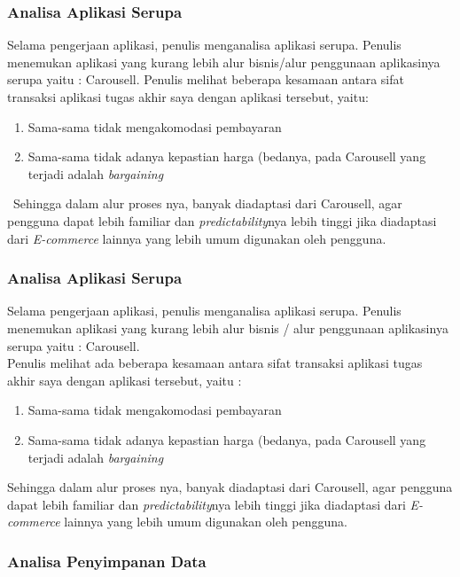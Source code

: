 	\subsubsection{Analisa Aplikasi Serupa}
	\label{alasan-app-serupa}
		Selama pengerjaan aplikasi, penulis menganalisa aplikasi serupa. Penulis menemukan aplikasi yang kurang lebih alur bisnis/alur penggunaan aplikasinya serupa yaitu : Carousell. Penulis melihat beberapa kesamaan antara sifat transaksi aplikasi tugas akhir saya dengan aplikasi tersebut, yaitu:
		\begin{enumerate}
			\item Sama-sama tidak mengakomodasi pembayaran
			\item Sama-sama tidak adanya kepastian harga (bedanya, pada Carousell yang terjadi adalah \textit{bargaining}
		\end{enumerate} \
		\indent Sehingga dalam alur proses nya, banyak diadaptasi dari Carousell, agar pengguna dapat lebih familiar dan \textit{predictability}nya lebih tinggi jika diadaptasi dari \textit{E-commerce} lainnya yang lebih umum digunakan oleh pengguna.
		
	
	\subsubsection{Analisa Aplikasi Serupa}
	\label{alasan-app-serupa}
	Selama pengerjaan aplikasi, penulis menganalisa aplikasi serupa. Penulis menemukan aplikasi yang kurang lebih alur bisnis / alur penggunaan aplikasinya serupa yaitu : Carousell. \\
	\indent Penulis melihat ada beberapa kesamaan antara sifat transaksi aplikasi tugas akhir saya dengan aplikasi tersebut, yaitu :
	\begin{enumerate}
		\item Sama-sama tidak mengakomodasi pembayaran
		\item Sama-sama tidak adanya kepastian harga (bedanya, pada Carousell yang terjadi adalah \textit{bargaining}
	\end{enumerate}
	\indent Sehingga dalam alur proses nya, banyak diadaptasi dari Carousell, agar pengguna dapat lebih familiar dan \textit{predictability}nya lebih tinggi jika diadaptasi dari \textit{E-commerce} lainnya yang lebih umum digunakan oleh pengguna.
	
	\subsubsection{Analisa Penyimpanan Data}
	
